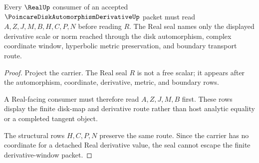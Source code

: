 \begin{theorem}
\label{thm:poincare-disk-automorphism-derivative-real-seal-nonescape}
Every $\RealUp$ consumer of an accepted $\PoincareDiskAutomorphismDerivativeUp$ packet must read $A,Z,J,M,B,H,C,P,N$ before reading $R$. The Real seal names only the displayed derivative scale or norm reached through the disk automorphism, complex coordinate window, hyperbolic metric preservation, and boundary transport route.
\end{theorem}
\begin{proof}
Project the carrier. The Real seal $R$ is not a free scalar; it appears after the automorphism, coordinate, derivative, metric, and boundary rows.

A Real-facing consumer must therefore read $A,Z,J,M,B$ first. These rows display the finite disk-map and derivative route rather than host analytic equality or a completed tangent object.

The structural rows $H,C,P,N$ preserve the same route. Since the carrier has no coordinate for a detached Real derivative value, the seal cannot escape the finite derivative-window packet.
\end{proof}




